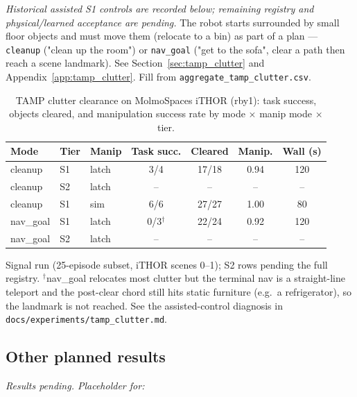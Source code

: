 \textit{Historical assisted S1 controls are recorded below; remaining registry and physical/learned acceptance are pending.} The robot starts surrounded by small floor objects and must
move them (relocate to a bin) as part of a plan --- \texttt{cleanup} ("clean up the
room") or \texttt{nav\_goal} ("get to the sofa", clear a path then reach a scene
landmark). See Section~\ref{sec:tamp_clutter} and Appendix~\ref{app:tamp_clutter}.
Fill from \texttt{aggregate\_tamp\_clutter.csv}.

\begin{table}[t]
  \centering
  \caption{TAMP clutter clearance on MolmoSpaces iTHOR (rby1): task success, objects cleared, and
  manipulation success rate by mode $\times$ manip mode $\times$ tier.}
  \label{tab:tamp_clutter}
  \small
  \setlength{\tabcolsep}{4pt}
  \begin{tabular}{@{}lllcccc@{}}
    \toprule
    Mode & Tier & Manip & Task succ. & Cleared & Manip. & Wall (s) \\
    \midrule
    cleanup & S1 & latch & 3/4 & 17/18 & 0.94 & 120 \\
    cleanup & S2 & latch & -- & -- & -- & -- \\
    cleanup & S1 & sim & 6/6 & 27/27 & 1.00 & 80 \\
    nav\_goal & S1 & latch & 0/3$^{\dagger}$ & 22/24 & 0.92 & 120 \\
    nav\_goal & S2 & latch & -- & -- & -- & -- \\
    \bottomrule
  \end{tabular}
  \vspace{2pt}
  {\footnotesize Signal run (25-episode subset, iTHOR scenes 0--1); S2 rows pending the full
  registry. $^{\dagger}$nav\_goal relocates most clutter but the terminal nav is a straight-line
  teleport and the post-clear chord still hits static furniture (e.g.\ a refrigerator), so the
  landmark is not reached. See the assisted-control diagnosis in
  \texttt{docs/experiments/tamp\_clutter.md}.}
\end{table}

\subsection{Other planned results}

\textit{Results pending. Placeholder for:}

